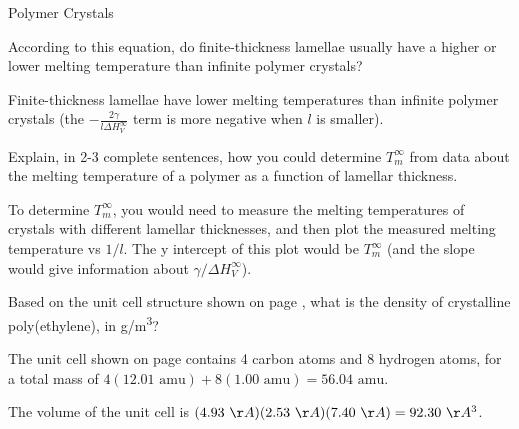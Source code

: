 \begin{activity}{Polymer Crystals}
\begin{ctqs}
	\question According to this equation, do finite-thickness lamellae usually have a higher or lower melting temperature than infinite polymer crystals?
	
		\begin{solution}[1in]{}
			Finite-thickness lamellae have lower melting temperatures than infinite polymer crystals (the $-\frac{2\gamma}{l \Delta H^\infty_V}$ term is more negative when $l$ is smaller).
		\end{solution}
	
	\question Explain, in 2-3 complete sentences, how you could determine $T_m^\infty$ from data about the melting temperature of a polymer as a function of lamellar thickness.
	
		\begin{solution}[1.5in]{}
			To determine $T_m^\infty$, you would need to measure the melting temperatures of crystals with different lamellar thicknesses, and then plot the measured melting temperature vs $1/l$.  The y intercept of this plot would be $T_m^\infty$ (and the slope would give information about $\gamma/\Delta H_V^\infty$).
		\end{solution}
 
\end{ctqs}

%
%	
%
%	
%	

\begin{exercises}


	\exercise Based on the unit cell structure shown on page \pageref{\labelbase:info:PEcrystal}, what is the density of crystalline poly(ethylene), in g/m\textsuperscript{3}?
	
		\begin{solution}{}
		
		The unit cell shown on page \pageref{\labelbase:info:PEcrystal} contains 4 carbon atoms and 8 hydrogen atoms, for a total mass of $4(12.01\text{ amu}) + 8(1.00\text{ amu}) = 56.04\text{ amu}$.
		
		The volume of the unit cell is $(4.93~\AA)(2.53~\AA)(7.40~\AA) = 92.30~\AA^3$.
		

\end{solution}
\end{exercises}
\end{activity}
